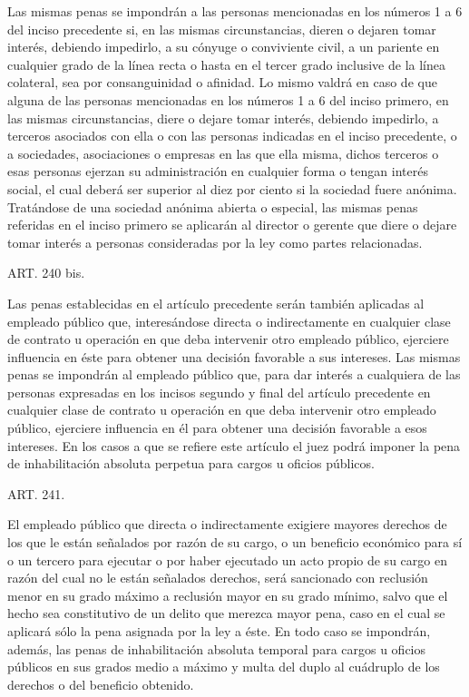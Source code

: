     Las mismas penas se impondrán a las personas mencionadas en los números 1 a 6 del inciso precedente si, en las mismas circunstancias, dieren o dejaren tomar interés, debiendo impedirlo, a su cónyuge o conviviente civil, a un pariente en cualquier grado de la línea recta o hasta en el tercer grado inclusive de la línea colateral, sea por consanguinidad o afinidad.
    Lo mismo valdrá en caso de que alguna de las personas mencionadas en los números 1 a 6 del inciso primero, en las mismas circunstancias, diere o dejare tomar interés, debiendo impedirlo, a terceros asociados con ella o con las personas indicadas en el inciso precedente, o a sociedades, asociaciones o empresas en las que ella misma, dichos terceros o esas personas ejerzan su administración en cualquier forma o tengan interés social, el cual deberá ser superior al diez por ciento si la sociedad fuere anónima.
    Tratándose de una sociedad anónima abierta o especial, las mismas penas referidas en el inciso primero se aplicarán al director o gerente que diere o dejare tomar interés a personas consideradas por la ley como partes relacionadas.

    ART. 240 bis.


    Las penas establecidas en el artículo precedente serán también aplicadas al empleado público que, interesándose directa o indirectamente en cualquier clase de contrato u operación en que deba intervenir otro empleado público, ejerciere influencia en éste para obtener una decisión favorable a sus intereses.
    Las mismas penas se impondrán al empleado público que, para dar interés a cualquiera de las personas expresadas en los incisos segundo y final del artículo precedente en cualquier clase de contrato u operación en que deba intervenir otro empleado público, ejerciere influencia en él para obtener una decisión favorable a esos intereses.
    En los casos a que se refiere este artículo el juez podrá imponer la pena de inhabilitación absoluta perpetua para cargos u oficios públicos.


    ART. 241.

    El empleado público que directa o indirectamente exigiere mayores derechos de los que le están señalados por razón de su cargo, o un beneficio económico para sí o un tercero para ejecutar o por haber ejecutado un acto propio de su cargo en razón del cual no le están señalados derechos, será sancionado con reclusión menor en su grado máximo a reclusión mayor en su grado mínimo, salvo que el hecho sea constitutivo de un delito que merezca mayor pena, caso en el cual se aplicará sólo la pena asignada por la ley a éste. En todo caso se impondrán, además, las penas de inhabilitación absoluta temporal para cargos u oficios públicos en sus grados medio a máximo y multa del duplo al cuádruplo de los derechos o del beneficio obtenido.



